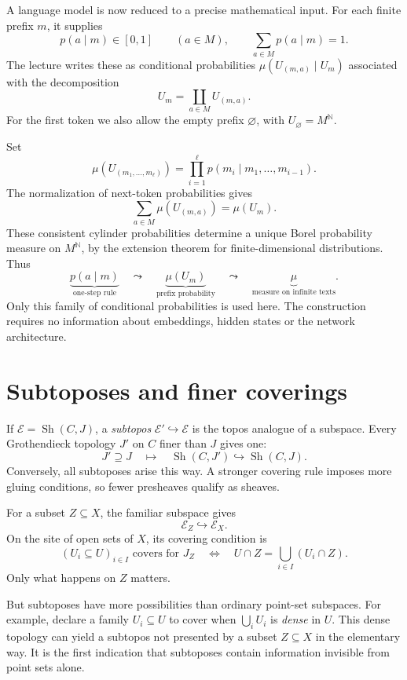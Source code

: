 A language model is now reduced to a precise mathematical input. For each finite prefix \(m\), it supplies
\[
 p(a\mid m)\in[0,1]\qquad(a\in M),
 \qquad\sum_{a\in M}p(a\mid m)=1.
\]
The lecture writes these as conditional probabilities \(\mu(U_{(m,a)}\mid U_m)\) associated with the decomposition
\[
 U_m=\coprod_{a\in M}U_{(m,a)}.
\]
For the first token we also allow the empty prefix \(\varnothing\), with \(U_\varnothing=M^{\mathbb N}\).

Set
\[
 \mu(U_{(m_1,\ldots,m_\ell)})
 =\prod_{i=1}^{\ell}
 p(m_i\mid m_1,\ldots,m_{i-1}).
\]
The normalization of next-token probabilities gives
\[
 \sum_{a\in M}\mu(U_{(m,a)})=\mu(U_m).
\]
These consistent cylinder probabilities determine a unique Borel probability measure on \(M^{\mathbb N}\), by the extension theorem for finite-dimensional distributions. Thus
\[
 \underbrace{p(a\mid m)}_{\text{one-step rule}}
 \quad\leadsto\quad
 \underbrace{\mu(U_m)}_{\text{prefix probability}}
 \quad\leadsto\quad
 \underbrace{\mu}_{\text{measure on infinite texts}}.
\]
Only this family of conditional probabilities is used here. The construction requires no information about embeddings, hidden states or the network architecture.

\section{Subtoposes and finer coverings}

If \(\mathcal E=\operatorname{Sh}(C,J)\), a \emph{subtopos} \(\mathcal E'\hookrightarrow\mathcal E\) is the topos analogue of a subspace. Every Grothendieck topology \(J'\) on \(C\) finer than \(J\) gives one:
\[
 J'\supseteq J
 \quad\longmapsto\quad
 \operatorname{Sh}(C,J')\hookrightarrow\operatorname{Sh}(C,J).
\]
Conversely, all subtoposes arise this way. A stronger covering rule imposes more gluing conditions, so fewer presheaves qualify as sheaves.

For a subset \(Z\subseteq X\), the familiar subspace gives
\[
 \mathcal E_Z\hookrightarrow\mathcal E_X.
\]
On the site of open sets of \(X\), its covering condition is
\[
 (U_i\subseteq U)_{i\in I}\text{ covers for }J_Z
 \quad\Longleftrightarrow\quad
 U\cap Z=\bigcup_{i\in I}(U_i\cap Z).
\]
Only what happens on \(Z\) matters.

But subtoposes have more possibilities than ordinary point-set subspaces. For example, declare a family \(U_i\subseteq U\) to cover when \(\bigcup_iU_i\) is \emph{dense} in \(U\). This dense topology can yield a subtopos not presented by a subset \(Z\subseteq X\) in the elementary way. It is the first indication that subtoposes contain information invisible from point sets alone.

